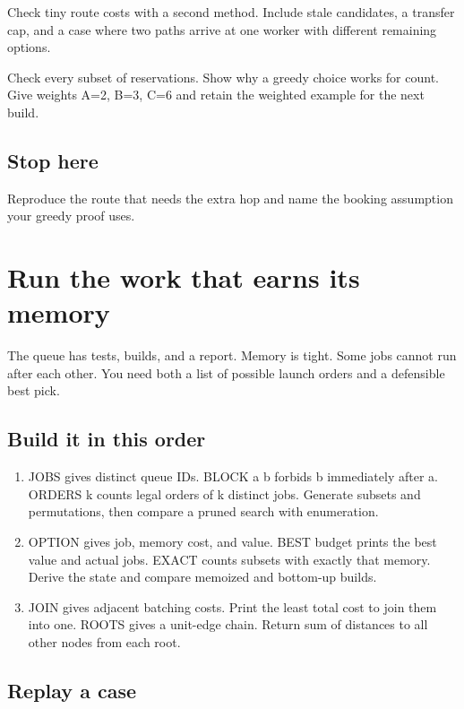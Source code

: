 \documentclass[11pt,letterpaper]{article}
\begin{document}
Check tiny route costs with a second method. Include stale candidates, a transfer cap, and a case where two paths arrive at one worker with different remaining options.

Check every subset of reservations. Show why a greedy choice works for count. Give weights A=2, B=3, C=6 and retain the weighted example for the next build.

\subsection*{Stop here}

Reproduce the route that needs the extra hop and name the booking assumption your greedy proof uses.

\clearpage

\section{Run the work that earns its memory}\label{datacenter:06}

The queue has tests, builds, and a report. Memory is tight. Some jobs cannot run after each other. You need both a list of possible launch orders and a defensible best pick.

\subsection*{Build it in this order}

\begin{enumerate}
\item JOBS gives distinct queue IDs. BLOCK a b forbids b immediately after a. ORDERS k counts legal orders of k distinct jobs. Generate subsets and permutations, then compare a pruned search with enumeration.
\item OPTION gives job, memory cost, and value. BEST budget prints the best value and actual jobs. EXACT counts subsets with exactly that memory. Derive the state and compare memoized and bottom-up builds.
\item JOIN gives adjacent batching costs. Print the least total cost to join them into one. ROOTS gives a unit-edge chain. Return sum of distances to all other nodes from each root.
\end{enumerate}

\subsection*{Replay a case}
\end{document}
